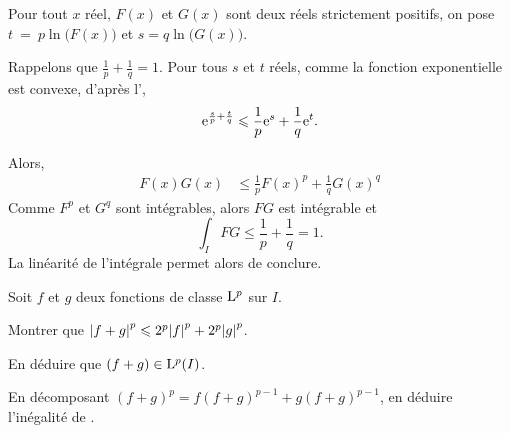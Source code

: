\begin{solution}
\begin{reponses}
\item Pour tout $x$ réel, $F(x)$ et $G(x)$ sont deux réels strictement positifs, on pose $t~=~p \ln\mathopen{}\big(F(x)\big)$ et $s = q \ln\mathopen{}\big(G(x)\big)$.

\item Rappelons que $\frac{1}{p} + \frac{1}{q} = 1$. Pour tous $s$ et $t$ réels, comme la fonction exponentielle est convexe, d'après l',
\[
\mathrm{e}^{\frac{s}{p} + \frac{t}{q}} \leqslant \frac{1}{p} \mathrm{e}^s + \frac{1}{q} \mathrm{e}^t.
\]

\item Alors,
\begin{align*}
F(x) G(x) &\leqslant \frac{1}{p} F(x)^p + \frac{1}{q} G(x)^q
\end{align*}
Comme $F^p$ et $G^q$ sont intégrables, alors $F G$ est intégrable et
\[
\int_I F G \leqslant \frac{1}{p} + \frac{1}{q} = 1.
\]
La linéarité de l'intégrale permet alors de conclure.
\end{reponses}
\end{solution}

\begin{exercice}
Soit $f$ et $g$ deux fonctions de classe $\mathrm{L}^p$ sur $I$.
\begin{questions}
\item Montrer que $\mathopen{}\left| f + g \right|^p \leqslant 2^p \mathopen{}\left| f \right|^p + 2^p \mathopen{}\left| g \right|^p$.

\item En déduire que $(f + g) \in \mathrm{L}^p(I)$.

\item En décomposant $(f + g)^p = f (f + g)^{p-1} + g (f + g)^{p-1}$, en déduire l'inégalité de .
\end{questions}
\end{exercice}

